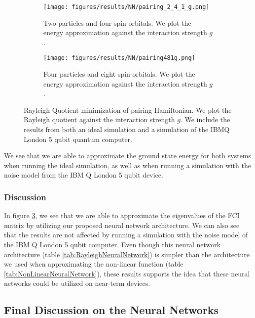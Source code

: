 \begin{figure}[H]
\begin{subfigure}{.5\textwidth}
  \centering
  \texttt{[image: figures/results/NN/pairing\_2\_4\_1\_g.png]}  
  \caption{Two particles and four spin-orbitals. We plot the energy approximation against the interaction strength $g$.}
  \label{fig:NNpairing241g}
\end{subfigure}
\begin{subfigure}{.5\textwidth}
  \centering
  \texttt{[image: figures/results/NN/pairing481g.png]}  
  \caption{Four particles and eight spin-orbitals. We plot the energy approximation against the interaction strength $g$. }
  \label{fig:NNpairing481g}
\end{subfigure}
\caption{Rayleigh Quotient minimization of pairing Hamiltonian. We plot the Rayleigh quotient against the interaction strength $g$. We include the results from both an ideal simulation and a simulation of the IBMQ London 5 qubit quantum computer.}
\label{fig:NNpairing}
\end{figure}
We see that we are able to approximate the ground state energy for both systems when running the ideal simulation, as well as when running a simulation with the noise model from the IBM Q London 5 qubit device.


\subsubsection{Discussion}
In figure \ref{fig:NNpairing}, we see that we are able to approximate the eigenvalues of the FCI matrix by utilizing our proposed neural network architecture. We can also see that the results are not affected by running a simulation with the noise model of the IBM Q London 5 qubit computer. Even though this neural network architecture (table \ref{tab:RayleighNeuralNetwork}) is simpler than the architecture we used when approximating the non-linear function (table \ref{tab:NonLinearNeuralNetwork}), these results supports the idea that these neural networks could be utilized on near-term devices.

\subsection{Final Discussion on the Neural Networks}

